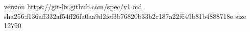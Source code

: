 version https://git-lfs.github.com/spec/v1
oid sha256:f136aff332af54ff26fa0aa9d2fef3b76820b33b2c187a22f649b81b4888718e
size 12790
